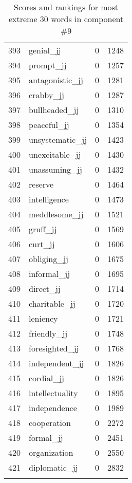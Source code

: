 \begin{longtable}[!htbp]{| rlr@{.}l |}
    393 & genial\_jj & 0 & 1248 \\
    394 & prompt\_jj & 0 & 1257 \\
    395 & antagonistic\_jj & 0 & 1281 \\
    396 & crabby\_jj & 0 & 1287 \\
    397 & bullheaded\_jj & 0 & 1310 \\
    398 & peaceful\_jj & 0 & 1354 \\
    399 & unsystematic\_jj & 0 & 1423 \\
    400 & unexcitable\_jj & 0 & 1430 \\
    401 & unassuming\_jj & 0 & 1432 \\
    402 & reserve & 0 & 1464 \\
    403 & intelligence & 0 & 1473 \\
    404 & meddlesome\_jj & 0 & 1521 \\
    405 & gruff\_jj & 0 & 1569 \\
    406 & curt\_jj & 0 & 1606 \\
    407 & obliging\_jj & 0 & 1675 \\
    408 & informal\_jj & 0 & 1695 \\
    409 & direct\_jj & 0 & 1714 \\
    410 & charitable\_jj & 0 & 1720 \\
    411 & leniency & 0 & 1721 \\
    412 & friendly\_jj & 0 & 1748 \\
    413 & foresighted\_jj & 0 & 1768 \\
    414 & independent\_jj & 0 & 1826 \\
    415 & cordial\_jj & 0 & 1826 \\
    416 & intellectuality & 0 & 1895 \\
    417 & independence & 0 & 1989 \\
    418 & cooperation & 0 & 2272 \\
    419 & formal\_jj & 0 & 2451 \\
    420 & organization & 0 & 2550 \\
    421 & diplomatic\_jj & 0 & 2832 \\
    \hline
    \caption{Scores and rankings for most extreme 30 words in component \#9} \\
\end{longtable}
